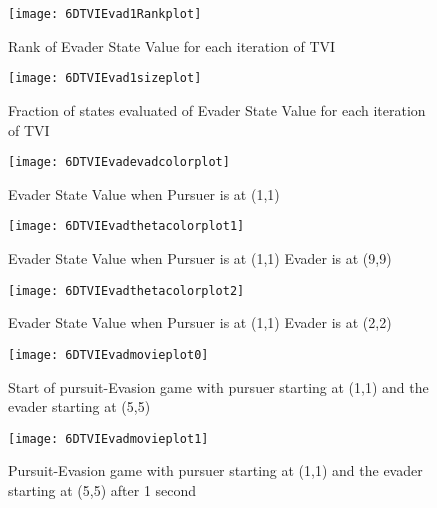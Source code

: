 \begin{figure}
\vspace{2.4in}
\centering
\texttt{[image: 6DTVIEvad1Rankplot]}
\caption{Rank of Evader State Value for each iteration of TVI}
\label{6DTVIEvad1Rankplot}
\end{figure}
\clearpage
\newpage

\begin{figure}
\vspace{2.4in}
\centering
\texttt{[image: 6DTVIEvad1sizeplot]}
\caption{Fraction of states evaluated of Evader State Value for each iteration of TVI}
\label{6DTVIEvad1sizeplot}
\end{figure}
\clearpage
\newpage

\begin{figure}
\vspace{2.4in}
\centering
\texttt{[image: 6DTVIEvadevadcolorplot]}
\caption{Evader State Value when Pursuer is at (1,1)}
\label{6DTVIEvadevadcolorplot}
\end{figure}
\clearpage
\newpage

\begin{figure}
\vspace{2.4in}
\centering
\texttt{[image: 6DTVIEvadthetacolorplot1]}
\caption{Evader State Value when Pursuer is at (1,1) Evader is at (9,9) }
\label{6DTVIEvadthetacolorplot1}
\end{figure}
\clearpage
\newpage

\begin{figure}
\vspace{2.4in}
\centering
\texttt{[image: 6DTVIEvadthetacolorplot2]}
\caption{Evader State Value when Pursuer is at (1,1) Evader is at (2,2) }
\label{6DTVIEvadthetacolorplot2}
\end{figure}
\clearpage
\newpage

\begin{figure}
\vspace{2.4in}
\centering
\texttt{[image: 6DTVIEvadmovieplot0]}
\caption{Start of pursuit-Evasion game with pursuer starting at (1,1) and the evader starting at (5,5)}
\label{6DTVIEvadmovieplot0}
\end{figure}
\clearpage
\newpage

\begin{figure}
\vspace{2.4in}
\centering
\texttt{[image: 6DTVIEvadmovieplot1]}
\caption{Pursuit-Evasion game with pursuer starting at (1,1) and the evader starting at (5,5) after 1 second}
\label{6DTVIEvadmovieplot1}
\end{figure}
\clearpage
\newpage


